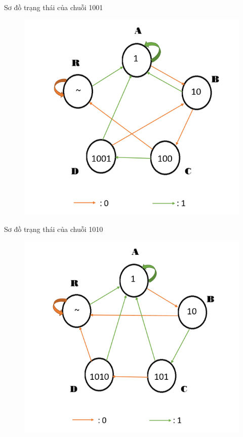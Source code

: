 \documentclass[a4paper]{article}
\begin{document}
		Sơ đồ trạng thái của chuỗi 1001
	\begin{center}
	\begin{figure}[h]
		\begin{center}
			\includegraphics[scale=0.53]{1001.png}
		\end{center}
	\end{figure}
	\end{center}
	\newpage
	Sơ đồ trạng thái của chuỗi 1010
	\begin{center}
	\begin{figure}[h]
		\begin{center}
			\includegraphics[scale=0.53]{1010.png}
		\end{center}
	\end{figure}
	\end{center}
	
\end{document}
